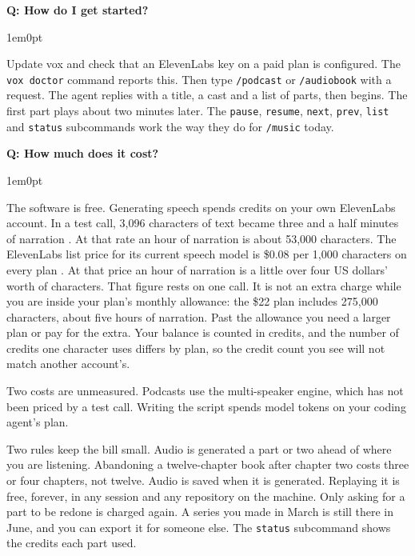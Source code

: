 \documentclass[11pt,letterpaper]{article} %
\newcounter{faqnum} %
\newenvironment{faqpair}[1]{%
  \needspace{4\baselineskip}%
  \vspace{0.5em}%
  \refstepcounter{faqnum}%
  \noindent\textbf{\color{SectionBlue}Q\thefaqnum: #1}\par\nopagebreak[4]%
  \vspace{0.2em}%
  \begin{adjustwidth}{1em}{0pt}%
  \setlength{\parindent}{0pt}%
  \setlength{\parskip}{0.5em}%
}{%
  \end{adjustwidth}%
  \vspace{0.5em}%
}
\begin{document}
\begin{faqpair}{How do I get started?}\label{faq:getting-started}

  Update vox and check that an ElevenLabs key on a paid plan is configured.
  The \texttt{vox doctor} command reports this. Then type \texttt{/podcast}
  or \texttt{/audiobook} with a request. The agent replies with a title, a
  cast and a list of parts, then begins. The first part plays about two
  minutes later. The \texttt{pause}, \texttt{resume}, \texttt{next},
  \texttt{prev}, \texttt{list} and \texttt{status} subcommands work the way
  they do for \texttt{/music} today.
\end{faqpair}

\begin{faqpair}{How much does it cost?}\label{faq:cost}

  The software is free. Generating speech spends credits on your own
  ElevenLabs account. In a test call, 3,096 characters of text became three
  and a half minutes of narration \cite{voxspike2026audiobook}. At that
  rate an hour of narration is about 53,000 characters. The ElevenLabs list
  price for its current speech model is \$0.08 per 1,000 characters on
  every plan \cite{elevenlabs2026pricing}. At that price an hour of
  narration is a little over four US dollars' worth of characters. That
  figure rests on one call. It is not an extra charge while you are inside
  your plan's monthly allowance: the \$22 plan includes 275,000 characters,
  about five hours of narration. Past the allowance you need a larger plan
  or pay for the extra. Your balance is counted in credits, and the number
  of credits one character uses differs by plan, so the credit count you
  see will not match another account's.

  Two costs are unmeasured. Podcasts use the multi-speaker engine, which
  has not been priced by a test call. Writing the script spends model
  tokens on your coding agent's plan.

  Two rules keep the bill small. Audio is generated a part or two ahead of
  where you are listening. Abandoning a twelve-chapter book after chapter
  two costs three or four chapters, not twelve. Audio is saved when it is generated. Replaying
  it is free, forever, in any session and any repository on the machine.
  Only asking for a part to be redone is charged again. A
  series you made in March is still there in June, and you can export it
  for someone else. The \texttt{status} subcommand shows the
  credits each part used.
\end{faqpair}
\end{document}
